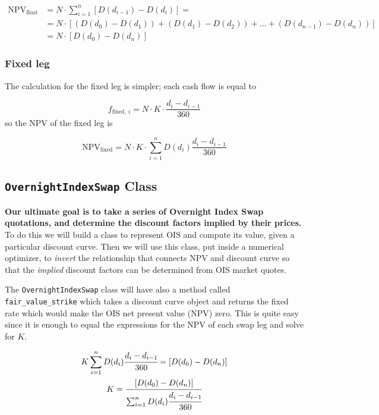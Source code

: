 \begin{equation}
  \begin{split}
    \mathrm{NPV}_{\mathrm{float}} & = N\cdot\sum_{i=1}^{n}[D(d_{i-1}) - D(d_i)] =  \\
    &= N\cdot[(D(d_{0}) - D(d_{1})) + (D(d_{1}) - D(d_{2})) + ... + (D(d_{n-1}) - D(d_{n}))]\\
    &= N \cdot [D(d_0) - D(d_n)]
  \end{split}
\end{equation}

\subsubsection{Fixed leg}\label{fixed-leg}

The calculation for the fixed leg is simpler; each cash flow is equal to

\begin{equation}
f_{\mathrm{fixed},~i}=N\cdot K\cdot \frac{d_i - d_{i-1}}{360}
\end{equation}
so the NPV of the fixed leg is

\begin{equation}
\mathrm{NPV}_{\mathrm{fixed}} = N\cdot K\cdot \sum_{i=1}^{n}D(d_{i})\frac{d_i - d_{i-1}}{360}
\end{equation}

\subsection{\texttt{OvernightIndexSwap} Class}\label{discount-factor-determination-from-market-quotes}

\textbf{Our ultimate goal is to take a series of Overnight Index Swap quotations, and determine the discount factors implied by their prices.} To do this we will build a class to represent OIS and compute its value, given a particular discount curve. Then we will use this class, put inside a numerical optimizer, to \emph{invert} the relationship that connects NPV and discount curve so that the \emph{implied} discount factors can be determined from OIS market quotes.

The \texttt{OvernightIndexSwap} class will have also a method called \texttt{fair\_value\_strike} which takes a discount curve object and returns the fixed rate which would make the OIS net present value (NPV) zero. This is quite easy since it is enough to equal the expressions for the NPV of each swap leg and solve for $K$.

\begin{equation}
\begin{gathered}
K \sum_{i=1}^{n}D(d_{i})\cfrac{d_i - d_{i-1}}{360} = [D(d_0) - D(d_n)] \\
K = \cfrac{[D(d_0) - D(d_n)]}{\sum_{i=1}^{n}D(d_{i})\cfrac{d_i - d_{i-1}}{360}}
\end{gathered}
\end{equation}

